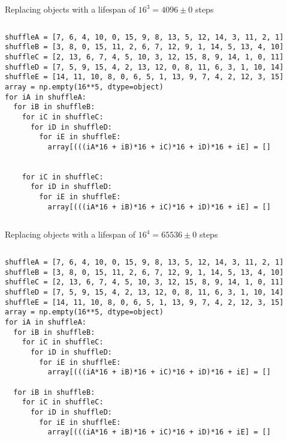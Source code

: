 \documentclass[aspectratio=169]{beamer}
\begin{document}
\begin{frame}[fragile]{Replacing objects with a lifespan of $16^3 = 4096 \pm 0$ steps}
\small
\begin{columns}
\begin{verbatim}
shuffleA = [7, 6, 4, 10, 0, 15, 9, 8, 13, 5, 12, 14, 3, 11, 2, 1]
shuffleB = [3, 8, 0, 15, 11, 2, 6, 7, 12, 9, 1, 14, 5, 13, 4, 10]
shuffleC = [2, 13, 6, 7, 4, 5, 10, 3, 12, 15, 8, 9, 14, 1, 0, 11]
shuffleD = [7, 5, 9, 15, 4, 2, 13, 12, 0, 8, 11, 6, 3, 1, 10, 14]
shuffleE = [14, 11, 10, 8, 0, 6, 5, 1, 13, 9, 7, 4, 2, 12, 3, 15]
array = np.empty(16**5, dtype=object)
for iA in shuffleA:
  for iB in shuffleB:
    for iC in shuffleC:
      for iD in shuffleD:
        for iE in shuffleE:
          array[(((iA*16 + iB)*16 + iC)*16 + iD)*16 + iE] = []


    for iC in shuffleC:
      for iD in shuffleD:
        for iE in shuffleE:
          array[(((iA*16 + iB)*16 + iC)*16 + iD)*16 + iE] = []
\end{verbatim}
\end{columns}
\end{frame}

\begin{frame}[fragile]{Replacing objects with a lifespan of $16^4 = 65536 \pm 0$ steps}
\small
\begin{columns}
\begin{verbatim}
shuffleA = [7, 6, 4, 10, 0, 15, 9, 8, 13, 5, 12, 14, 3, 11, 2, 1]
shuffleB = [3, 8, 0, 15, 11, 2, 6, 7, 12, 9, 1, 14, 5, 13, 4, 10]
shuffleC = [2, 13, 6, 7, 4, 5, 10, 3, 12, 15, 8, 9, 14, 1, 0, 11]
shuffleD = [7, 5, 9, 15, 4, 2, 13, 12, 0, 8, 11, 6, 3, 1, 10, 14]
shuffleE = [14, 11, 10, 8, 0, 6, 5, 1, 13, 9, 7, 4, 2, 12, 3, 15]
array = np.empty(16**5, dtype=object)
for iA in shuffleA:
  for iB in shuffleB:
    for iC in shuffleC:
      for iD in shuffleD:
        for iE in shuffleE:
          array[(((iA*16 + iB)*16 + iC)*16 + iD)*16 + iE] = []

  for iB in shuffleB:
    for iC in shuffleC:
      for iD in shuffleD:
        for iE in shuffleE:
          array[(((iA*16 + iB)*16 + iC)*16 + iD)*16 + iE] = []
\end{verbatim}
\end{columns}
\end{frame}
\end{document}
